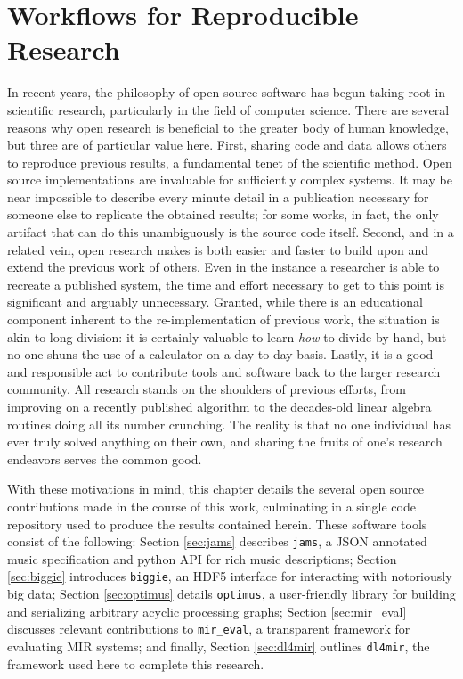 

\graphicspath{{7/figures/}}

\chapter{Workflows for Reproducible Research}
\label{chp:reproducibility}

In recent years, the philosophy of open source software has begun taking root in scientific research, particularly in the field of computer science.
There are several reasons why open research is beneficial to the greater body of human knowledge, but three are of particular value here.
First, sharing code and data allows others to reproduce previous results, a fundamental tenet of the scientific method.
Open source implementations are invaluable for sufficiently complex systems.
It may be near impossible to describe every minute detail in a publication necessary for someone else to replicate the obtained results;
for some works, in fact, the only artifact that can do this unambiguously is the source code itself.
Second, and in a related vein, open research makes is both easier and faster to build upon and extend the previous work of others.
Even in the instance a researcher is able to recreate a published system, the time and effort necessary to get to this point is significant and arguably unnecessary.
Granted, while there is an educational component inherent to the re-implementation of previous work, the situation is akin to long division:
it is certainly valuable to learn \emph{how} to divide by hand, but no one shuns the use of a calculator on a day to day basis.
Lastly, it is a good and responsible act to contribute tools and software back to the larger research community.
All research stands on the shoulders of previous efforts, from improving on a recently published algorithm to the decades-old linear algebra routines doing all its number crunching.
The reality is that no one individual has ever truly solved anything on their own, and sharing the fruits of one's research endeavors serves the common good.

With these motivations in mind, this chapter details the several open source contributions made in the course of this work, culminating in a single code repository used to produce the results contained herein.
These software tools consist of the following:
Section \ref{sec:jams} describes \texttt{jams}, a JSON annotated music specification and python API for rich music descriptions;
Section \ref{sec:biggie} introduces \texttt{biggie}, an HDF5 interface for interacting with notoriously big data;
Section \ref{sec:optimus} details \texttt{optimus}, a user-friendly library for building and serializing arbitrary acyclic processing graphs;
Section \ref{sec:mir_eval} discusses relevant contributions to \texttt{mir\_eval}, a transparent framework for evaluating MIR systems;
and finally, Section \ref{sec:dl4mir} outlines \texttt{dl4mir}, the framework used here to complete this research.


